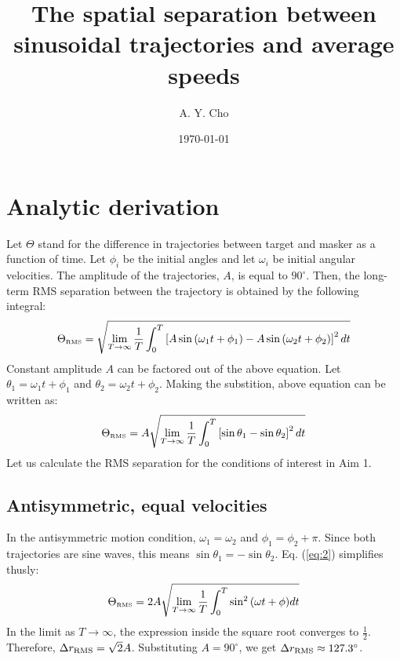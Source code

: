 \documentclass[12pt]{article}
\title{The spatial separation between sinusoidal trajectories and average speeds}
\author{A. Y. Cho}
\date{\today}
\begin{document}
\maketitle

\section{Analytic derivation}
Let $\Theta$ stand for the difference in trajectories between target and masker as a function of time. Let $\phi_i$ be the initial angles and let $\omega_i$ be initial angular velocities. The amplitude of the trajectories, $A$, is equal to $90^{\circ}$. Then, the long-term RMS separation between the trajectory is obtained by the following integral:
\begin{equation}\label{eq:1}
  \Theta_{\textrm{\tiny RMS}} = \sqrt{ \lim_{T \to \infty} \frac{1}{T} \int^{T}_0 \left[A\sin{\left(\omega_1 t + \phi_1 \right)} - A\sin{\left(\omega_2 t + \phi_2 \right)} \right]^2 dt}
\end{equation}
Constant amplitude $A$ can be factored out of the above equation. Let $\theta_1 = \omega_1 t + \phi_1$ and $\theta_2 = \omega_2 t + \phi_2$. Making the substition, above equation can be written as:
\begin{equation}\label{eq:2}
  \Theta_{\textrm{\tiny RMS}} = A \sqrt{ \lim_{T \to \infty} \frac{1}{T} \int^{T}_0 \left[\sin{\theta_1} - \sin{\theta_2} \right]^2 dt}
\end{equation}
Let us calculate the RMS separation for the conditions of interest in Aim 1.

\subsection{Antisymmetric, equal velocities}
In the antisymmetric motion condition, $\omega_1 = \omega_2$ and $\phi_1 = \phi_2 + \pi$. Since both trajectories are sine waves, this means $\sin{\theta_1} = -\sin{\theta_2}$. Eq. (\ref{eq:2}) simplifies thusly:
\begin{equation}
  \Theta_{\textrm{\tiny RMS}} = 2A \sqrt{ \lim_{T \to \infty} \frac{1}{T} \int^{T}_0 \sin^2{\left(\omega t + \phi\right)} dt}
\end{equation}
In the limit as $T \to \infty$, the expression inside the square root converges to $\frac{1}{2}$. Therefore, $\Delta r_{\tiny \textrm{RMS}} = \sqrt{2}A$. Substituting $A = 90^{\circ}$, we get $\Delta r_{\tiny \textrm{RMS}} \approx 127.3^{\circ}$.
\end{document}

